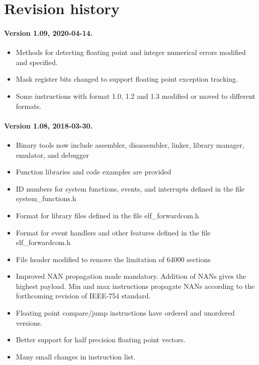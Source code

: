 \documentclass[forwardcom.tex]{subfiles}
\begin{document}
\RaggedRight

\chapter{Revision history}
\subsubsection{Version 1.09, 2020-04-14.}

\begin{itemize}
\item Methods for detecting floating point and integer numerical errors modified and specified.
\item Mask register bits changed to support floating point exception tracking.
\item Some instructions with format 1.0, 1.2 and 1.3 modified or moved to different formats.
\end{itemize}


\subsubsection{Version 1.08, 2018-03-30.}
\begin{itemize}

\item Binary tools now include assembler, disassembler, linker, library manager, emulator, and debugger
\item Function libraries and code examples are provided
\item ID numbers for system functions, events, and interrupts defined in the file system\_functions.h
\item Format for library files defined in the file elf\_forwardcom.h
\item Format for event handlers and other features defined in the file elf\_forwardcom.h
\item File header modified to remove the limitation of 64000 sections
\item Improved NAN propagation made mandatory. Addition of NANs gives the highest payload. 
Min and max instructions propagate NANs according to the forthcoming revision of IEEE-754 standard.
\item Floating point compare/jump instructions have ordered and unordered versions.
\item Better support for half precision floating point vectors.
\item Many small changes in instruction list. 
\end{itemize}
\end{document}
